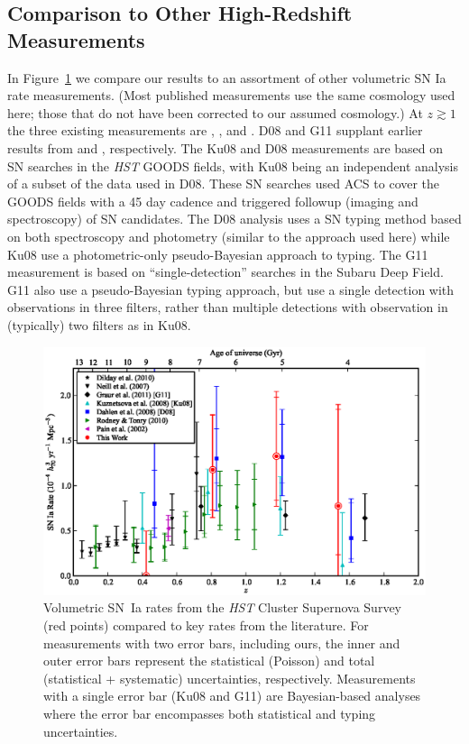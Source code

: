 
\subsection{Comparison to Other High-Redshift Measurements}

In Figure~\ref{fig:ratecompilation} we compare our results to an
assortment of other volumetric SN Ia rate measurements. (Most
published measurements use the same cosmology used here; those that do
not have been corrected to our assumed cosmology.) At $z \gtrsim 1$
the three existing measurements are \citet[][hereafter
  Ku08]{kuznetsova08a}, \citet[][hereafter D08]{dahlen08a}, and
\citet[][hereafter G11]{graur11a}. D08 and G11 supplant earlier
results from \citet{dahlen04a} and \citet{poznanski07a},
respectively. The Ku08 and D08 measurements are based on SN searches
in the \emph{HST} GOODS fields, with Ku08 being an independent
analysis of a subset of the data used in D08. These SN searches used
ACS to cover the GOODS fields with a 45 day cadence and triggered
followup (imaging and spectroscopy) of SN candidates. The D08 analysis
uses a SN typing method based on both spectroscopy and photometry
(similar to the approach used here) while Ku08 use a photometric-only
pseudo-Bayesian approach to typing. The G11 measurement is based on
``single-detection'' searches in the Subaru Deep Field. G11 also use a
pseudo-Bayesian typing approach, but use a single detection with
observations in three filters, rather than multiple detections with
observation in (typically) two filters as in Ku08.

\begin{figure}[tb]
\begin{center}
\includegraphics[width=\textwidth]{figures/fieldrate/ratecompilation.eps}
\end{center}
\caption[Volumetric SN~Ia rates from this work and the
  literature]{Volumetric SN~Ia rates from the \emph{HST} Cluster
  Supernova Survey (red points) compared to key rates from the
  literature. For measurements with two error bars, including ours,
  the inner and outer error bars represent the statistical (Poisson)
  and total (statistical + systematic) uncertainties,
  respectively. Measurements with a single error bar (Ku08 and G11)
  are Bayesian-based analyses where the error bar encompasses both
  statistical and typing uncertainties.\label{fig:ratecompilation}}
\end{figure}

